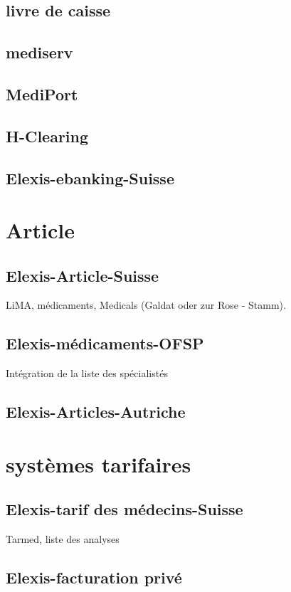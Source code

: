 \documentclass[paper=a4,BCOR8.25mm]{scrartcl}
\begin{document}
\subsection{livre de caisse}
\subsection{mediserv}
\subsection{MediPort}
\subsection{H-Clearing}

\subsection{Elexis-ebanking-Suisse}

\section{Article}
\subsection{Elexis-Article-Suisse}
LiMA, médicaments, Medicals (Galdat oder zur Rose - Stamm).

\subsection{Elexis-médicaments-OFSP}
Intégration de la liste des spécialistés 
\subsection{Elexis-Articles-Autriche}


\section{systèmes tarifaires}
\subsection{Elexis-tarif des médecins-Suisse}
Tarmed, liste des analyses
\subsection{Elexis-facturation privé}
\end{document}
